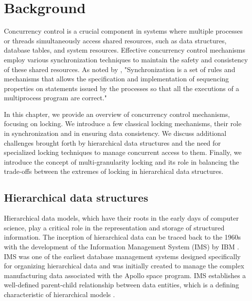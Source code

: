 %

\chapter{Background} \label{chap:background}

\minitoc

Concurrency control is a crucial component in systems where multiple processes or threads simultaneously access shared resources, such as data structures, database tables, and system resources. Effective concurrency control mechanisms employ various synchronization techniques to maintain the safety and consistency of these shared resources. As noted by \citet{DBLP:books/daglib/0030596}, "Synchronization is a set of rules and mechanisms that allows the specification and implementation of sequencing properties on statements issued by the processes so that all the executions of a multiprocess program are correct."

In this chapter, we provide an overview of concurrency control mechanisms, focusing on locking. We introduce a few classical locking mechanisms, their role in synchronization and in ensuring data consistency. We discuss additional challenges brought forth by hierarchical data structures and the need for specialized locking techniques to manage concurrent access to them. Finally, we introduce the concept of multi-granularity locking and its role in balancing the trade-offs between the extremes of locking in hierarchical data structures.


\section{Hierarchical data structures}

Hierarchical data models, which have their roots in the early days of computer science, play a critical role in the representation and storage of structured information. The inception of hierarchical data can be traced back to the 1960s with the development of the Information Management System (IMS) by IBM \cite{IBMIMS}. IMS was one of the earliest database management systems designed specifically for organizing hierarchical data and was initially created to manage the complex manufacturing data associated with the Apollo space program. IMS establishes a well-defined parent-child relationship between data entities, which is a defining characteristic of hierarchical models \cite{DBLP:books/daglib/0006734}.

